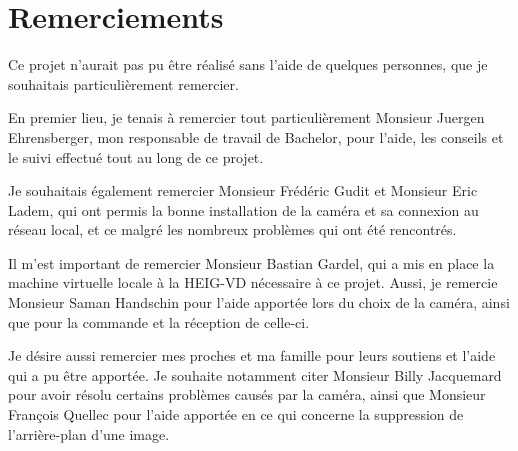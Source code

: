 \chapter*{Remerciements}
\thispagestyle{empty}

Ce projet n'aurait pas pu être réalisé sans l'aide de quelques personnes, que je souhaitais particulièrement remercier.

En premier lieu, je tenais à remercier tout particulièrement Monsieur Juergen Ehrensberger, mon responsable de travail de Bachelor, pour l'aide, les conseils et le suivi effectué tout au long de ce projet.

Je souhaitais également remercier Monsieur Frédéric Gudit et Monsieur Eric Ladem, qui ont permis la bonne installation de la caméra et sa connexion au réseau local, et ce malgré les nombreux problèmes qui ont été rencontrés.

Il m'est important de remercier Monsieur Bastian Gardel, qui a mis en place la machine virtuelle locale à la HEIG-VD nécessaire à ce projet. Aussi, je remercie Monsieur Saman Handschin pour l'aide apportée lors du choix de la caméra, ainsi que pour la commande et la réception de celle-ci. 

Je désire aussi remercier mes proches et ma famille pour leurs soutiens et l'aide qui a pu être apportée. Je souhaite notamment citer Monsieur Billy Jacquemard pour avoir résolu certains problèmes causés par la caméra, ainsi que Monsieur François Quellec pour l'aide apportée en ce qui concerne la suppression de l'arrière-plan d'une image.